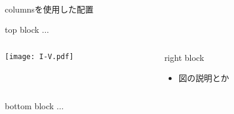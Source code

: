 \documentclass[12pt, unicode]{beamer} %
\begin{document}
\begin{frame}{columnsを使用した配置}
  \begin{block}{top block}
    ...
  \end{block}
  \begin{columns}[c]  %
    \begin{column}{0.3\textwidth} %
      \texttt{[image: I-V.pdf]}
    \end{column}
    \begin{column}{0.65\textwidth} %
      \begin{block}{right block}
        \begin{itemize}
          \item 図の説明とか
        \end{itemize}
      \end{block}
    \end{column}
  \end{columns}
  \begin{block}{bottom block}
    ...
  \end{block}
\end{frame}
\end{document}
